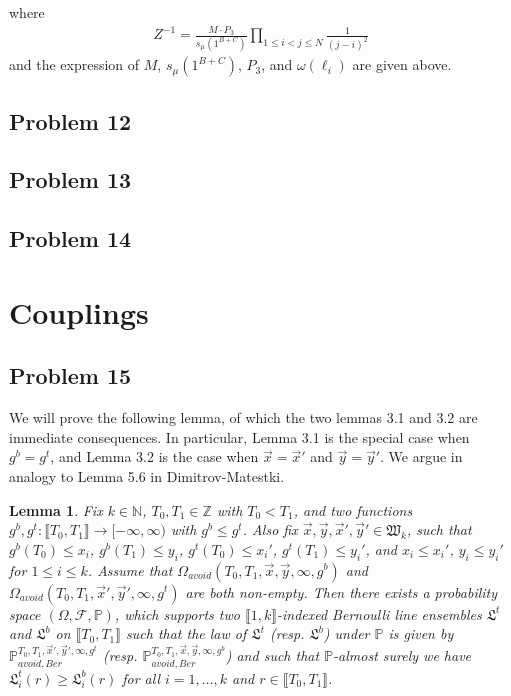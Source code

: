 \documentclass[12pt]{article}
\newtheorem*{lemma*}{Lemma}
\begin{document}
	where
	\begin{align*}
	Z^{-1}=\frac{M\cdot P_{3}}{s_{\mu}(1^{B+C})}\prod_{1\leqslant i<j\leqslant N}\frac{1}{(j-i)^{2}}
	\end{align*}
	and the expression of $M$, $s_{\mu}(1^{B+C})$, $P_{3}$, and $\omega(\ell_{i})$ are given above.
	
	\subsection*{Problem 12}

	\subsection*{Problem 13}

	\subsection*{Problem 14}


\section{Couplings}

	\subsection*{Problem 15}
	
	We will prove the following lemma, of which the two lemmas 3.1 and 3.2 are immediate consequences. In particular, Lemma 3.1 is the special case when $g^b = g^t$, and Lemma 3.2 is the case when $\vec{x} = \vec{x}'$ and $\vec{y} = \vec{y}'$. We argue in analogy to Lemma 5.6 in Dimitrov-Matestki.
	
	\begin{lemma*}
		Fix $k \in \mathbb{N}$, $T_0, T_1 \in \mathbb{Z}$ with $T_0 < T_1$, and two functions $g^b, g^t: \llbracket T_0, T_1 \rrbracket  \rightarrow [-\infty, \infty)$ with $g^b\leq g^t$. Also fix $\vec{x}, \vec{y}, \vec{x}', \vec{y}' \in \mathfrak{W}_k$, such that $g^b(T_0)\leq x_i$, $g^b(T_1)\leq y_i$, $g^t(T_0)\leq x_i'$, $g^t(T_1)\leq y_i'$, and $x_i\leq x_i'$, $y_i\leq y_i'$ for $1\leq i\leq k$. Assume that $\Omega_{avoid}(T_0, T_1, \vec{x}, \vec{y}, \infty,g^b)$ and $\Omega_{avoid}(T_0, T_1, \vec{x}', \vec{y}', \infty,g^t)$ are both non-empty. Then there exists a probability space $(\Omega, \mathcal{F}, \mathbb{P})$, which supports two $\llbracket 1, k \rrbracket$-indexed Bernoulli line ensembles $\mathfrak{L}^t$ and $\mathfrak{L}^b$ on $\llbracket T_0, T_1 \rrbracket$ such that the law of $\mathfrak{L}^{t}$ {\big (}resp. $\mathfrak{L}^b${\big )} under $\mathbb{P}$ is given by $\mathbb{P}_{avoid, Ber}^{T_0, T_1, \vec{x}', \vec{y}', \infty, g^t}$ {\big (}resp. $\mathbb{P}_{avoid, Ber}^{T_0, T_1, \vec{x}, \vec{y}, \infty, g^b}${\big )} and such that $\mathbb{P}$-almost surely we have $\mathfrak{L}_i^t(r) \geq \mathfrak{L}^b_i(r)$ for all $i = 1,\dots, k$ and $r \in \llbracket T_0, T_1 \rrbracket$.
	\end{lemma*}
\end{document}
